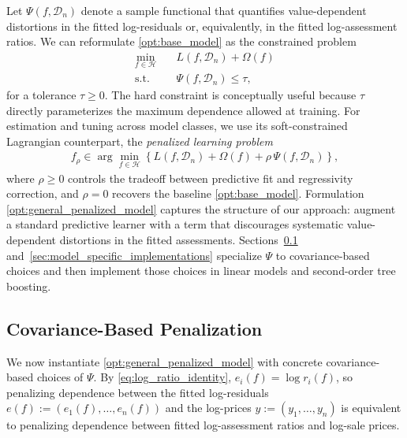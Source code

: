 \documentclass{article}
\theoremstyle{plain}
\theoremstyle{definition}
\newcommand{\1}{\mathbf{1}}
\newcommand{\D}{\mathcal{D}}
\renewcommand{\H}{\mathcal{H}}
\begin{document}
Let $\Psi(f,\D_n)$ denote a sample functional that quantifies value-dependent distortions in the fitted log-residuals or, equivalently, in the fitted log-assessment ratios. We can reformulate \eqref{opt:base_model} as the constrained problem
\begin{align}
\label{opt:general_constrained_model}
\min_{f\in\H}
\quad
& L(f, \D_n)+\Omega(f)
\\
\text{s.t.}\quad
& \Psi(f, \D_n)\le \tau,
\nonumber
\end{align}
for a tolerance $\tau\ge 0$. The hard constraint is conceptually useful because $\tau$ directly parameterizes the maximum dependence allowed at training. For estimation and tuning across model classes, we use its soft-constrained Lagrangian counterpart, the \emph{penalized learning problem}
\begin{align}
\label{opt:general_penalized_model}
f_\rho
\in
\arg\min_{f\in\H}
\left\{
L(f, \D_n)+\Omega(f)+\rho\,\Psi(f, \D_n)
\right\},
\end{align}
where $\rho\ge 0$ controls the tradeoff between predictive fit and regressivity correction, and $\rho=0$ recovers the baseline \eqref{opt:base_model}. Formulation \eqref{opt:general_penalized_model} captures the structure of our approach: augment a standard predictive learner with a term that discourages systematic value-dependent distortions in the fitted assessments. Sections~\ref{sec:covariance_penalty_learning} and~\ref{sec:model_specific_implementations} specialize $\Psi$ to covariance-based choices and then implement those choices in linear models and second-order tree boosting.



\subsection{Covariance-Based Penalization}
\label{sec:covariance_penalty_learning}

We now instantiate \eqref{opt:general_penalized_model} with concrete covariance-based choices of $\Psi$. By \eqref{eq:log_ratio_identity}, $e_i(f)=\log r_i(f)$, so penalizing dependence between the fitted log-residuals $e(f):=(e_1(f),\dots,e_n(f))$ and the log-prices $y:=(y_1,\dots,y_n)$ is equivalent to penalizing dependence between fitted log-assessment ratios and log-sale prices.
\end{document}
